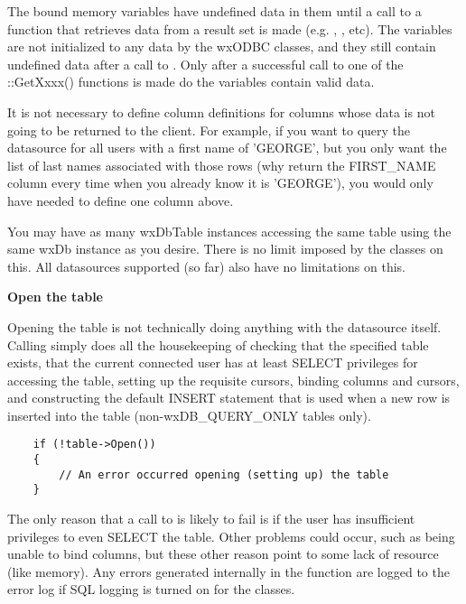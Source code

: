 The bound memory variables have undefined data in them until a call to a 
function that retrieves data from a result set is made 
(e.g. ,
, etc). The variables are not 
initialized to any data by the wxODBC classes, and they still contain 
undefined data after a call to . Only 
after a successful call to one of the ::GetXxxx() functions is made do the 
variables contain valid data.

It is not necessary to define column definitions for columns whose data is 
not going to be returned to the client. For example, if you want to query 
the datasource for all users with a first name of 'GEORGE', but you only want 
the list of last names associated with those rows (why return the FIRST\_NAME 
column every time when you already know it is 'GEORGE'), you would only have 
needed to define one column above.

You may have as many wxDbTable instances accessing the same table using the 
same wxDb instance as you desire. There is no limit imposed by the classes 
on this. All datasources supported (so far) also have no limitations on this.

{\bf Open the table}

Opening the table is not technically doing anything with the datasource 
itself. Calling  simply does all the 
housekeeping of checking that the specified table exists, that the current 
connected user has at least SELECT privileges for accessing the table, 
setting up the requisite cursors, binding columns and cursors, and 
constructing the default INSERT statement that is used when a new row is 
inserted into the table (non-wxDB\_QUERY\_ONLY tables only).

\begin{verbatim}
    if (!table->Open())
    {
        // An error occurred opening (setting up) the table
    }
\end{verbatim}

The only reason that a call to  is likely to fail is if the 
user has insufficient privileges to even SELECT the table. Other problems 
could occur, such as being unable to bind columns, but these other reason 
point to some lack of resource (like memory). Any errors generated 
internally in the  function are logged to the error log 
if SQL logging is turned on for the classes.

